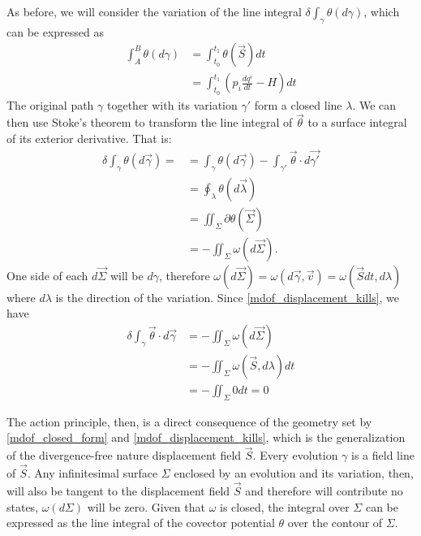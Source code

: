\documentclass[10pt,twocolumn, nofootinbib]{revtex4-2}
\begin{document}
As before, we will consider the variation of the line integral $\delta \int_{\gamma} \theta(d\gamma)$, which can be expressed as
\begin{equation}
	\begin{aligned}
		\int_A^B \theta(d\gamma) &= \int^{t_1}_{t_0} \theta(\vec{S}) dt \\
		&= \int^{t_1}_{t_0} \left(p_i \frac{dq^i}{dt} - H \right) dt
	\end{aligned}
\end{equation}
The original path $\gamma$ together with its variation $\gamma'$ form a closed line $\lambda$. We can then use Stoke's theorem to transform the line integral of $\vec{\theta}$ to a surface integral of its exterior derivative. That is:
\begin{align*}
	\delta \int_{\gamma} \theta(d\vec{\gamma}) = 
	&= \int_{\gamma} \theta(d\vec{\gamma}) - \int_{\gamma'} \vec{\theta} \cdot d\vec{\gamma'} \\
	&= \oint_{\lambda} \theta(d\vec{\lambda}) \\
	&= \iint_{\Sigma} \partial \theta (\vec{\Sigma}) \\
	&= - \iint_{\Sigma} \omega(d\vec{\Sigma}).
\end{align*}
One side of each $d\vec{\Sigma}$ will be $d\gamma$, therefore $\omega(d\vec{\Sigma}) = \omega(d\vec{\gamma}, \vec{v}) = \omega(\vec{S}dt, d\lambda)$ where $d\lambda$ is the direction of the variation. Since \ref{mdof_displacement_kills}, we have
\begin{equation}
	\begin{aligned}
	\delta \int_{\gamma} \vec{\theta} \cdot d\vec{\gamma} &= - \iint_{\Sigma} \omega(d\vec{\Sigma}) \\
	&= - \iint_{\Sigma} \omega(\vec{S}, d\lambda) dt \\
	&= - \iint_{\Sigma} 0 dt = 0
	\end{aligned}
\end{equation}

The action principle, then, is a direct consequence of the geometry set by \ref{mdof_closed_form} and \ref{mdof_displacement_kills}, which is the generalization of the divergence-free nature displacement field $\vec{S}$. Every evolution $\gamma$ is a field line of $\vec{S}$. Any infinitesimal surface $\Sigma$ enclosed by an evolution and its variation, then, will also be tangent to the displacement field $\vec{S}$ and therefore will contribute no states, $\omega(d\Sigma)$ will be zero. Given that $\omega$ is closed, the integral over $\Sigma$ can be expressed as the line integral of the covector potential $\theta$ over the contour of $\Sigma$.
\end{document}
